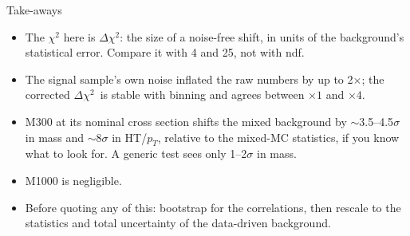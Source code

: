 \documentclass[aspectratio=169,11pt]{beamer}
\newcommand{\dchi}{\ensuremath{\Delta\chi^2}}
\begin{document}
\begin{frame}{Take-aways}
  \begin{itemize}
    \item The $\chi^2$ here is \dchi: the size of a noise-free shift, in units of the
          background's statistical error. Compare it with 4 and 25, not with ndf.
    \item The signal sample's own noise inflated the raw numbers by up to 2$\times$;
          the corrected \dchi\ is stable with binning and agrees between $\times 1$
          and $\times 4$.
    \item M300 at its nominal cross section shifts the mixed background by
          $\sim$3.5--4.5$\sigma$ in mass and $\sim$8$\sigma$ in HT/$p_T$, relative to
          the mixed-MC statistics, if you know what to look for. A generic test sees
          only 1--2$\sigma$ in mass.
    \item M1000 is negligible.
    \item Before quoting any of this: bootstrap for the correlations, then rescale to
          the statistics and total uncertainty of the data-driven background.
  \end{itemize}
\end{frame}
\end{document}
